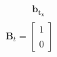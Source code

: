 \documentclass[preview]{standalone}
\begin{document}
\begin{align*}
\begin{array}{c}\begin{matrix}\hspace{1cm} \mathbf{b_{t_x}}\end{matrix} \\  \mathbf{B}_t = \begin{bmatrix} 1 \\ \\0  \end{bmatrix} \end{array}
\end{align*}
\end{document}
